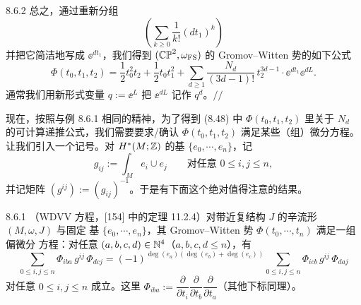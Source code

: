 \begin{wexam}{8.6.2}
总之，通过重新分组
\[
  \left(\sum_{k\ge0}\frac{1}{k!}(dt_1)^k\right)
\]
并把它简洁地写成 $\ee^{dt_1}$，我们得到 $(\mathbb{CP}^2,\omega_{\mathrm{FS}})$ 的
Gromov--Witten 势的如下公式
\begin{equation}
  \Phi(t_0,t_1,t_2)
  =\frac12t_0^2t_2+\frac12t_0t_1^2
  +\sum_{d\ge1}\frac{N_d}{(3d-1)!}\,t_2^{3d-1}\cdot\ee^{dt_1}\ee^{dL}.
  \tag{8.48}
\end{equation}
通常我们用新形式变量 $q:=\ee^L$ 把 $\ee^{dL}$ 记作 $q^d$。\hspace*{\fill}$//$
\end{wexam}

现在，按照与例 8.6.1 相同的精神，为了得到 (8.48) 中 $\Phi(t_0,t_1,t_2)$ 里关于
$N_d$ 的可计算递推公式，我们需要要求/确认 $\Phi(t_0,t_1,t_2)$ 满足某些（组）微分方程。
让我们引入一个记号。对 $H^*(M;\mathbb{Z})$ 的基 $\{e_0,\cdots,e_n\}$，记
\[
  g_{ij}:=\int_Me_i\cup e_j\qquad\text{对任意 } 0\le i,j\le n,
\]
并记矩阵 $(g^{ij}):=(g_{ij})^{-1}$。于是有下面这个绝对值得注意的结果。

\begin{wthm}{8.6.1}
（WDVV 方程，[154] 中的定理 11.2.4）对带近复结构 $J$ 的辛流形 $(M,\omega,J)$ 与固定
基 $\{e_0,\cdots,e_n\}$，其 Gromov--Witten 势 $\Phi(t_0,\cdots,t_n)$ 满足一组偏微分
方程：对任意 $(a,b,c,d)\in\mathbb{N}^4$（$a,b,c,d\le n$），有
\begin{equation}
  \sum_{0\le i,j\le n}\Phi_{iba}\,g^{ij}\,\Phi_{dcj}
  =(-1)^{\deg(e_a)(\deg(e_b)+\deg(e_c))}
  \sum_{0\le i,j\le n}\Phi_{icb}\,g^{ij}\,\Phi_{daj}
  \tag{8.49}
\end{equation}
对任意 $0\le i,j\le n$ 成立。这里
$\Phi_{iba}:=\dfrac{\partial}{\partial t_i}\dfrac{\partial}{\partial t_b}
\dfrac{\partial}{\partial t_a}$（其他下标同理）。
\end{wthm}

